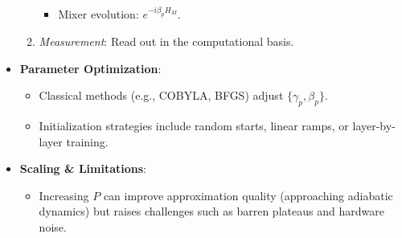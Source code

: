 \begin{multicols}{3}
\begin{itemize}[leftmargin=*,nosep,topsep=0pt]
\begin{enumerate}[nosep]
\begin{itemize}[nosep]
                            \item Mixer evolution: \(e^{-i\beta_p H_M}\).
                          \end{itemize}
                        \item \textit{Measurement}: Read out in the computational basis.
                      \end{enumerate}
                    \item \textbf{Parameter Optimization}:
                      \begin{itemize}[nosep]
                        \item Classical methods (e.g., COBYLA, BFGS) adjust \(\{\gamma_p,\beta_p\}\).
                        \item Initialization strategies include random starts, linear ramps, or layer-by-layer training.
                      \end{itemize}
                    \item \textbf{Scaling \& Limitations}:
                      \begin{itemize}[nosep]
                        \item Increasing \(P\) can improve approximation quality (approaching adiabatic dynamics) but raises challenges such as barren plateaus and hardware noise.
                      \end{itemize}
                  \end{itemize}


\end{multicols}
